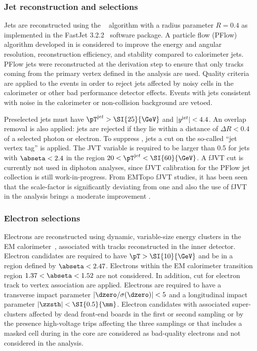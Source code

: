 \subsubsection{Jet reconstruction and selections}
Jets are reconstructed using the  \antikt~\cite{Cacciari:2008gp}
algorithm with a radius parameter $R=0.4$ as implemented in the {\textsc FastJet} 3.2.2~\cite{Fastjet,Cacciari:2005hq} software package. A particle flow (PFlow) algorithm developed in  is considered to improve the energy and angular resolution, reconstruction efficiency, and \pileup stability compared to calorimeter jets. PFlow jets were reconstructed at the derivation step to ensure that only tracks coming from the primary vertex defined in the analysis are used. Quality criteria are applied to the events in order to reject jets affected by noisy cells in the calorimeter or other bad performance detector effects. Events with jets consistent with noise in the calorimeter or non-collision background are vetoed.

Preselected jets must have $\pT^{\textrm jet} > \SI{25}{\GeV}$ and $|y^{\textrm jet} |<4.4$. An overlap removal is also applied: jets are rejected if they lie within a distance
of $\Delta R < 0.4$ of a selected photon or electron. To suppress \pileup, jets a cut on the so-called ``jet vertex tag'' is applied. The JVT variable is required
to be larger than 0.5 for jets with $\abseta< 2.4$ in the region $20<\pT^{\textrm jet}<\SI{60}{\GeV}$. A fJVT cut is currently not used in diphoton analyses, since fJVT calibration for the
PFlow jet collection is still work-in-progress. From EMTopo fJVT studies, it has been seen that the scale-factor is significantly deviating from one and also the use of fJVT in the analysis brings a moderate improvement .



\subsubsection{Electron selections}
Electrons are reconstructed using dynamic, variable-size energy clusters in the EM calorimeter~\cite{ATL-PHYS-PUB-2017-022}, associated with tracks reconstructed in the inner detector. Electron candidates are required to have $\pT>\SI{10}{\GeV}$  and be in a region defined by $\abseta<2.47$. Electrons within the EM calorimeter transition region $1.37<\abseta<1.52$ are not considered. In addition, cut for electron track to vertex association are applied. Electrons are required to have a transverse impact parameter $\left|\dzero/\sigma(\dzero)\right|<5$ and a longitudinal impact parameter $\left|\zzsth\right|<\SI{0.5}{\mm}$. Electron candidates with associated super-clusters affected by dead front-end boards in the first or second sampling or by the presence high-voltage trips affecting the three samplings or that includes a masked cell during in the core are considered as bad-quality electrons and not considered in the analysis.

